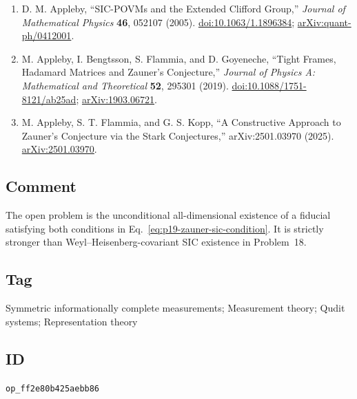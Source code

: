 \begin{enumerate}[label={},leftmargin=4.8em,labelsep=0.5em]
  \footnotesize
  \item[\textup{[App05]}]\label{ref:p19-appleby-clifford}
  D. M. Appleby, ``SIC-POVMs and the Extended Clifford Group,''
  \emph{Journal of Mathematical Physics} \textbf{46}, 052107 (2005).
  \href{https://doi.org/10.1063/1.1896384}{doi:10.1063/1.1896384};
  \href{https://arxiv.org/abs/quant-ph/0412001}{arXiv:quant-ph/0412001}.

  \item[\textup{[ABFG19]}]\label{ref:p19-appleby-data}
  M. Appleby, I. Bengtsson, S. Flammia, and D. Goyeneche,
  ``Tight Frames, Hadamard Matrices and Zauner's Conjecture,''
  \emph{Journal of Physics A: Mathematical and Theoretical} \textbf{52},
  295301 (2019).
  \href{https://doi.org/10.1088/1751-8121/ab25ad}{doi:10.1088/1751-8121/ab25ad};
  \href{https://arxiv.org/abs/1903.06721}{arXiv:1903.06721}.

  \item[\textup{[AFK25]}]\label{ref:p19-appleby-stark}
  M. Appleby, S. T. Flammia, and G. S. Kopp,
  ``A Constructive Approach to Zauner's Conjecture via the Stark
  Conjectures,'' arXiv:2501.03970 (2025).
  \href{https://arxiv.org/abs/2501.03970}{arXiv:2501.03970}.
\end{enumerate}

\subsection*{Comment}

The open problem is the unconditional all-dimensional existence of a fiducial
satisfying both conditions in Eq.~\eqref{eq:p19-zauner-sic-condition}.  It is
strictly stronger than Weyl--Heisenberg-covariant SIC existence in Problem~18.

\subsection*{Tag}

Symmetric informationally complete measurements; Measurement theory;
Qudit systems; Representation theory

\subsection*{ID}

\texttt{op\_ff2e80b425aebb86}
